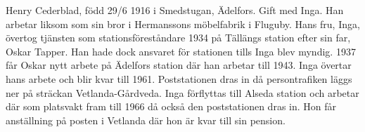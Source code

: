 Henry Cederblad, född 29/6 1916 i Smedstugan, Ädelfors. Gift med Inga.
Han arbetar liksom som sin bror i Hermanssons möbelfabrik i Fluguby.
Hans fru, Inga, övertog tjänsten som stationsföreståndare 1934 på Tällängs station efter sin far, Oskar Tapper. Han hade dock ansvaret för stationen tills Inga blev myndig. 1937 får Oskar nytt arbete på Ädelfors station där han arbetar till 1943. Inga övertar hans arbete och blir kvar till 1961. Poststationen dras in då persontrafiken läggs ner på sträckan Vetlanda-Gårdveda. Inga förflyttas till Alseda station och arbetar där som platsvakt fram till 1966 då också den poststationen dras in. Hon får anställning på posten i Vetlanda där hon är kvar till sin pension.

\bye